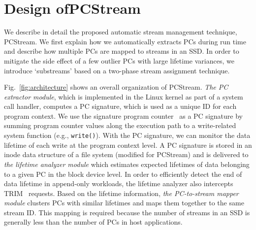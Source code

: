 \vspace{-7pt}
\section{Design ofPCStream}
\vspace{-5pt}
We describe in detail the proposed automatic stream management technique, \textsf{\small 
PCStream}.  We first explain how we automatically extracts PCs during
run time and describe how multiple PCs are mapped to streams in an SSD.
In order to mitigate the side effect of a few outlier PCs with large lifetime variances, 
we introduce `substreams' based on a two-phase
stream assignment technique.


Fig.~\ref{fig:architecture} shows an overall organization of \textsf{\small PCStream}.
\textit{The PC extractor module}, which is implemented in the Linux kernel as
part of a system call handler, 
computes a PC signature, which is used as a unique ID for each program context.  
We use the signature program counter~\cite{PC} as a PC signature 
by summing program counter values along the execution path to a write-related system function 
(e.g., {\tt write()}).  
With the PC signature, we can monitor the data lifetime of each write at the program context level. 
A PC signature is stored
in an inode data structure of a file system (modified for \textsf{\small PCStream})
and is delivered to \textit{the lifetime analyzer module} which estimates
expected lifetimes of data belonging to a given PC in the block device level.
In order to efficiently detect the end of data lifetime in append-only
workloads, the lifetime analyzer also intercepts TRIM~\cite{TRIM} requests. %
Based on the lifetime information, \textit{the PC-to-stream
mapper module} clusters PCs with similar lifetimes and maps them together to
the same stream ID.  This mapping is required because 
the number of streams in an SSD is generally less than the number of PCs in host applications.

\vspace{-10pt}
